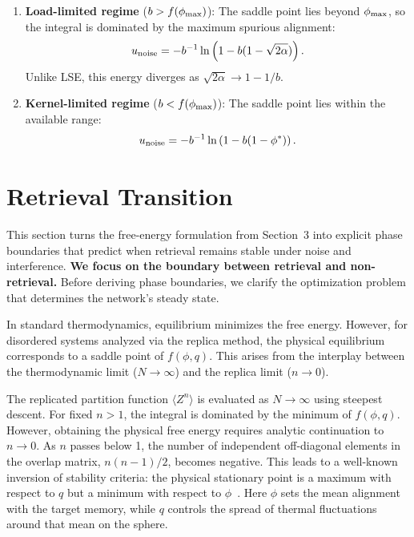 \documentclass{article}
\theoremstyle{plain}
\theoremstyle{definition}
\theoremstyle{remark}
\begin{document}
\begin{enumerate}
    \item \textbf{\textbf{Load-limited} regime} ($b > f(\phi_{\rm max})$): The saddle point lies beyond $\phi_{\rm max}$, so the integral is dominated by the maximum spurious alignment:
    \begin{equation}
        u_{\rm noise} = -b^{-1} \ln \left( 1 - b(1 - \sqrt{2\alpha}) \right).
    \end{equation}
    Unlike LSE, this energy diverges as $\sqrt{2\alpha} \to 1 - 1/b$.

    \item \textbf{\textbf{Kernel-limited} regime} ($b < f(\phi_{\rm max})$): The saddle point lies within the available range:
    \begin{equation}
        u_{\rm noise} = -b^{-1} \ln \left( 1 - b(1 - \phi^*) \right).
    \end{equation}
\end{enumerate}


\section{\textbf{Retrieval Transition}}\label{sec:transition}

This section turns the free-energy formulation from Section~3 into explicit phase boundaries that predict when retrieval remains stable under noise and interference.
\textbf{We focus on the boundary between retrieval and non-retrieval.} Before deriving phase boundaries, we clarify the optimization problem that determines the network's steady state. 

In standard thermodynamics, equilibrium minimizes the free energy. However, for disordered systems analyzed via the replica method, the physical equilibrium corresponds to a saddle point of $f(\phi, q)$. This arises from the interplay between the thermodynamic limit ($N \to \infty$) and the replica limit ($n \to 0$).

The replicated partition function $\langle Z^n \rangle$ is evaluated as $N \to \infty$ using steepest descent. For fixed $n > 1$, the integral is dominated by the minimum of $f(\phi, q)$. However, obtaining the physical free energy requires analytic continuation to $n \to 0$. As $n$ passes below 1, the number of independent off-diagonal elements in the overlap matrix, $n(n-1)/2$, becomes negative. This leads to a well-known inversion of stability criteria: the physical stationary point is a maximum with respect to $q$ but a minimum with respect to $\phi$~\citep{Almeida_1978}. Here $\phi$ sets the mean alignment with the target memory, while $q$ controls the spread of thermal fluctuations around that mean on the sphere.
\end{document}
